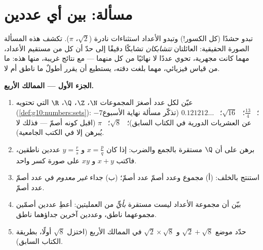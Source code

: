 \section{مسألة: بين أي عددين}

\begin{problem}
\label{pb:g10:numbers:1}
تبدو  حشدًا (كل الكسور!) وتبدو الأعداد
 استثناءات نادرة ($\sqrt2$، $\pi$). تكشف هذه المسألة
الصورة الحقيقية: العائلتان \emph{تتشابكان} تشابكًا دقيقًا
إلى حدّ أن كل  من مستقيم الأعداد، مهما كانت
مجهرية، تحوي عددًا لا نهائيًا من كل منهما --- مع نتائج
غريبة، منها هذه: ما من قياس فيزيائي، مهما بلغت
دقته، يستطيع أن يقرر أطولٌ ما ناطق أم لا.

\medskip
\noindent\textbf{الجزء الأول --- الممالك الأربع.}
\begin{enumerate}
  \item عيّن لكل عدد أصغرَ المجموعات $\N$،
        $\Z$، $\Q$، $\R$ التي تحتويه
        (\cref{def:g10:numbers:sets}): $-7$؛ \ $\frac{13}{4}$؛ \
        $\sqrt{16}$؛ \ $0.121212\ldots$ (تذكّر
        مسألة نهاية الأسبوع عن العشريات الدورية في الكتاب السابق)؛ \ $\sqrt8$؛ \ $\pi$ (اقبل
        كونه أصمّ --- فذلك لا يُبرهن إلا في الكتب
        الجامعية).
  \item برهن على أن $\Q$ مستقرة بالجمع
        والضرب: إذا كان $x = \frac pq$ و $y = \frac rs$
        عددين ناطقين، فاكتب $x + y$ و $xy$ على صورة كسر واحد.
  \item استنتج بالخلف: (أ) مجموع  وعدد
        أصمّ عدد أصمّ؛ (ب) جداء \omterm{def:g10:numbers:sets}{عدد ناطق}
        \emph{غير معدوم} في عدد أصمّ عدد أصمّ.
  \item بيّن أن مجموعة الأعداد  ليست مستقرة
        \emph{بأيٍّ} من العمليتين: أعطِ عددين أصمّين
        مجموعهما ناطق، وعددين آخرين جداؤهما ناطق.
  \item حدّد موضع $\sqrt2 + \sqrt8$ و $\sqrt2 \times \sqrt8$ في
        الممالك الأربع (اختزل $\sqrt8$ أولًا،
        بطريقة الكتاب السابق).
\end{enumerate}


\end{problem}
